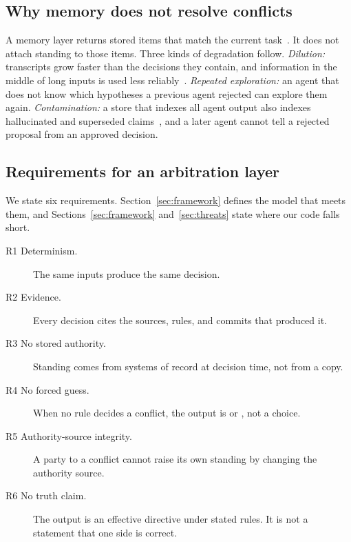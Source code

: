 \subsection{Why memory does not resolve conflicts}
A memory layer returns stored items that match the current task~\cite{lewis2020rag,packer2023memgpt,chhikara2025mem0}. It does not attach standing to those items. Three kinds of degradation follow. \emph{Dilution:} transcripts grow faster than the decisions they contain, and information in the middle of long inputs is used less reliably~\cite{liu2024lost}. \emph{Repeated exploration:} an agent that does not know which hypotheses a previous agent rejected can explore them again. \emph{Contamination:} a store that indexes all agent output also indexes hallucinated and superseded claims~\cite{ji2023hallucination}, and a later agent cannot tell a rejected proposal from an approved decision.

\subsection{Requirements for an arbitration layer}
We state six requirements. Section~\ref{sec:framework} defines the model that meets them, and Sections~\ref{sec:framework} and~\ref{sec:threats} state where our code falls short.
\begin{description}
    \item[R1 Determinism.] The same inputs produce the same decision.
    \item[R2 Evidence.] Every decision cites the sources, rules, and commits that produced it.
    \item[R3 No stored authority.] Standing comes from systems of record at decision time, not from a copy.
    \item[R4 No forced guess.] When no rule decides a conflict, the output is \sAMB{} or \sBC{}, not a choice.
    \item[R5 Authority-source integrity.] A party to a conflict cannot raise its own standing by changing the authority source.
    \item[R6 No truth claim.] The output is an effective directive under stated rules. It is not a statement that one side is correct.
\end{description}
